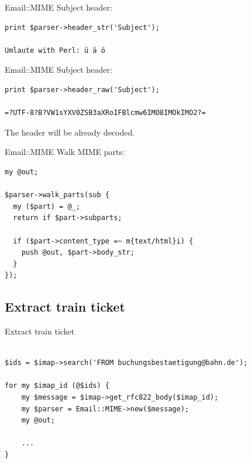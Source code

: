 \begin{frame}[fragile]{Email::MIME}
  Subject header:

\begin{verbatim}
print $parser->header_str('Subject');

Umlaute with Perl: ü ä ö

\end{verbatim}

\end{frame}

\begin{frame}[fragile]{Email::MIME}
  Subject header:

\begin{verbatim}
print $parser->header_raw('Subject');

=?UTF-8?B?VW1sYXV0ZSB3aXRoIFBlcmw6IMO8IMOkIMO2?=
\end{verbatim}

\end{frame}

The header will be already decoded.

\begin{frame}[fragile]{Email::MIME}
Walk MIME parts:

\begin{verbatim}
my @out;

$parser->walk_parts(sub {
  my ($part) = @_;
  return if $part->subparts;

  if ($part->content_type =~ m{text/html}i) {
    push @out, $part->body_str;
  }
});
\end{verbatim}
\end{frame}

\subsection{Extract train ticket}

\begin{frame}[fragile]{Extract train ticket}
\begin{verbatim}

$ids = $imap->search('FROM buchungsbestaetigung@bahn.de');

for my $imap_id (@$ids) {
    my $message = $imap->get_rfc822_body($imap_id);
    my $parser = Email::MIME->new($message);
    my @out;

    ...
}

\end{verbatim}
\end{frame}

